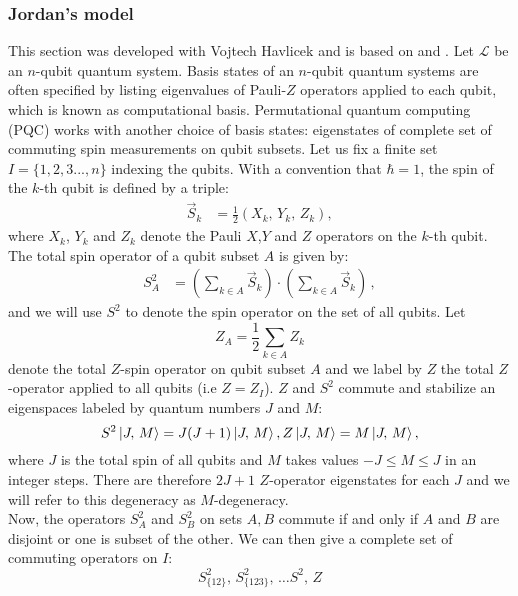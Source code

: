 \documentclass{article}
\begin{document}
\subsubsection{Jordan's model}
This section was developed with Vojtech Havlicek and is based on \cite{Havlicek17} and \cite{Jordan09}.
Let $\mathcal{L}$ be an $n$-qubit quantum system. Basis states of an $n$-qubit quantum systems are often specified by listing eigenvalues of Pauli-$Z$ operators applied to each qubit, which is known as computational basis.
Permutational quantum computing (PQC) works with another choice of basis states: eigenstates of complete set of commuting spin measurements on qubit subsets. Let us fix a finite set $I=\{1,2,3...,n\}$ indexing the qubits. With a convention that $\hbar = 1$, the spin of the $k$-th qubit is defined by a triple:
\begin{align*}
\vec{S}_k &= \frac{1}{2} \left( X_k, \, Y_k, \,Z_k \right),
\end{align*}
where $X_k$, $Y_k$ and $Z_k$ denote the Pauli $X$,$Y$ and $Z$ operators on the $k$-th qubit. The total spin operator of a qubit subset $A$  is given by:
\begin{align*}
S_A^2 &= \left( \sum_{k \in A} \vec{S}_k \right) \cdot  \left( \sum_{k \in A} \vec{S}_k \right)\,,
\end{align*} 
and we will use $S^2$ to denote the spin operator on the set of all qubits. 
Let 
$$Z_A = \frac{1}{2} \sum_{k \in A} Z_k $$ 
denote the total $Z$-spin operator on qubit subset $A$ and we label by $Z$ the total $Z$-operator applied to all qubits (i.e $Z=Z_I$). $Z$ and $S^2$ commute and stabilize an eigenspaces labeled by quantum numbers $J$ and $M$: 
\begin{equation}
S^2  \ket{J, \, M} = J (J +1 ) \ket{J, \, M},  \\
Z \ket{J, \, M} = M \ket{J, \, M},
\end{equation} 
where $J$ is the total spin of all qubits and $M$ takes values $ -J \leq M \leq J$ in an integer steps. There are therefore $2J + 1$ $Z$-operator eigenstates for each $J$ and we will refer to this degeneracy as $M$-degeneracy. \\
Now, the operators $S_A^2$ and $S_B^2$ on sets $A, B$ commute if and only if $A$ and $B$ are disjoint or one is subset of the other. We can then give a complete set of commuting operators on $I$:
\begin{equation} \label{comS}
S_{\lbrace12\rbrace}^2, \, S_{\lbrace123\rbrace}^2, \, \ldots S^2, \, Z
\end{equation}
\end{document}
